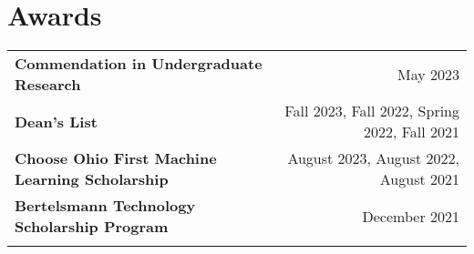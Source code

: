 \documentclass[letterpaper,8pt]{article} %
\begin{document}

\section{Awards}

\begin{tabular*}{\linewidth}{@{\extracolsep{\fill}} lr }
\textbf{Commendation in Undergraduate Research} & May 2023\\
\textbf{Dean's List} & Fall 2023, Fall 2022, Spring 2022, Fall 2021\\
\textbf{Choose Ohio First Machine Learning Scholarship} & August 2023, August 2022, August 2021\\
\textbf{Bertelsmann Technology Scholarship Program} & December 2021\\
\multicolumn{2}{p{\linewidth}}{}
\end{tabular*}
\end{document}
